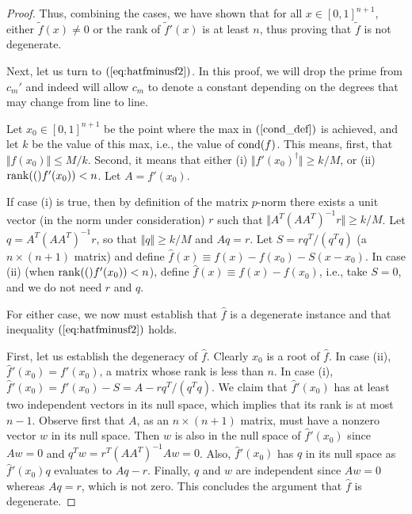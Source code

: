 \documentclass{article}
\newcommand{\cond}[1]{\mathop{\rm{cond}}(#1)}
\newcommand{\mpinv}[1]{#1^{\dagger}}  \newcommand\eps{\epsilon}
\newcommand\eref[1]{$(\ref{#1})$}
\newcommand{\rank}[1]{\mathop{\rm{rank}}(#1)}
\begin{document}
\begin{proof}
Thus, combining the cases, we have shown that for all $x\in[0,1]^{n+1}$, 
either
$\tilde f(x)\ne 0$ or the rank of $\tilde f'(x)$ is at least $n$, 
thus proving that $\tilde f$ is not degenerate.

Next, let us turn to \eref{eq:hatfminusf2}.   
In this proof, we will drop the prime from 
$c_m'$  and indeed will allow $c_m$ to denote a constant
depending on the degrees that may change from line to line.


Let $x_0\in[0,1]^{n+1}$ be the point where the max in \eref{cond_def} is
achieved, and let $k$ be the value of this max, i.e., the
value of $\cond{f}$. This means, first, that
$\Vert f(x_0)\Vert\le M/k$.  Second, it
means that either (i)
$\Vert \mpinv{f'(x_0)}\Vert\ge k/M$,  or (ii) $\rank(f'(x_0))<n$.
Let $A=f'(x_0)$. 

If case (i) is true, then by definition of the matrix
$p$-norm there exists a unit vector (in the norm under consideration) 
$r$
such that $\Vert A^T(AA^T)^{-1}r\Vert\ge k/M$.  Let $q=A^T(AA^T)^{-1}r$,
so that $\Vert q\Vert \ge k/M$ and $Aq=r$.  
Let $S=rq^T/(q^Tq)$ (a $n\times (n+1)$
matrix) and define $\hat f(x)\equiv f(x)-f(x_0)-S(x-x_0)$.  
In case (ii) (when $\rank(f'(x_0))<n$), define
$\hat f(x)\equiv f(x)-f(x_0)$, i.e., take $S=0$, and we do not need
$r$ and $q$.

For either case,
we now must establish that $\hat f$ is a degenerate instance
and that inequality \eref{eq:hatfminusf2} holds.

First, let us establish the degeneracy of $\hat f$.  Clearly $x_0$
is a root of $\hat f$.  In case (ii), $\hat f'(x_0)=f'(x_0)$, a matrix
whose rank is less than $n$.
In case (i),
$\hat f'(x_0)=f'(x_0)-S=A-rq^T/(q^Tq)$.
We claim that $\hat f'(x_0)$ has at least two independent vectors in its null space,
which implies that its rank is at most $n-1$.  Observe first that $A$, as 
an $n \times (n+1)$ matrix, must have a nonzero vector $w$ in its null space.
Then $w$ is also in the null space of $\hat f'(x_0)$ since $Aw=0$
and $q^Tw=r^T(AA^T)^{-1}Aw=0$.  Also, $\hat f'(x_0)$ has $q$ in
its null space as $\hat f'(x_0)q$ evaluates to $Aq-r$.  Finally, $q$ and
$w$ are independent since $Aw=0$ whereas $Aq=r$, which
is not zero.  This concludes the argument that $\hat f$ is
degenerate.  


\end{proof}
\end{document}
